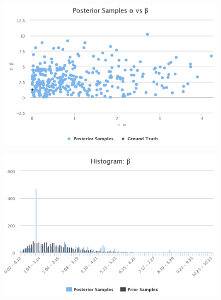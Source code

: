 \documentclass{beamer}
\begin{document}
\begin{frame}
\begin{figure}[h]
  \includegraphics[width=\textwidth]{samples2_ex1.png}
  \label{fig:Samples2Ex1}
\end{figure}
\end{frame}

\begin{frame}
  \begin{figure}[h]
  \includegraphics[width=\textwidth]{hist_ex1.png}
  \label{fig:HistEx1}
\end{figure}
\end{frame}



\end{document}
